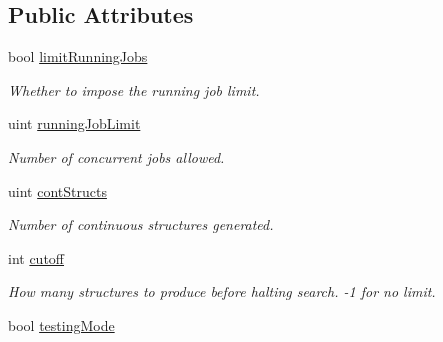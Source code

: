 \subsection*{Public Attributes}
\begin{DoxyCompactItemize}
\item 
\hypertarget{classGlobalSearch_1_1OptBase_a3b5202a4793e24dd7d42d1df9e94ee27}{bool \hyperlink{classGlobalSearch_1_1OptBase_a3b5202a4793e24dd7d42d1df9e94ee27}{limit\-Running\-Jobs}}\label{classGlobalSearch_1_1OptBase_a3b5202a4793e24dd7d42d1df9e94ee27}

\begin{DoxyCompactList}\small\item\em Whether to impose the running job limit. \end{DoxyCompactList}\item 
\hypertarget{classGlobalSearch_1_1OptBase_a02fd48b57bdd72ec4a4c20209967bd07}{uint \hyperlink{classGlobalSearch_1_1OptBase_a02fd48b57bdd72ec4a4c20209967bd07}{running\-Job\-Limit}}\label{classGlobalSearch_1_1OptBase_a02fd48b57bdd72ec4a4c20209967bd07}

\begin{DoxyCompactList}\small\item\em Number of concurrent jobs allowed. \end{DoxyCompactList}\item 
\hypertarget{classGlobalSearch_1_1OptBase_a973fbcff3e2abbc66c19236092439ce1}{uint \hyperlink{classGlobalSearch_1_1OptBase_a973fbcff3e2abbc66c19236092439ce1}{cont\-Structs}}\label{classGlobalSearch_1_1OptBase_a973fbcff3e2abbc66c19236092439ce1}

\begin{DoxyCompactList}\small\item\em Number of continuous structures generated. \end{DoxyCompactList}\item 
\hypertarget{classGlobalSearch_1_1OptBase_a6fe1eb9eef50d0c0851c7113cc8f24f0}{int \hyperlink{classGlobalSearch_1_1OptBase_a6fe1eb9eef50d0c0851c7113cc8f24f0}{cutoff}}\label{classGlobalSearch_1_1OptBase_a6fe1eb9eef50d0c0851c7113cc8f24f0}

\begin{DoxyCompactList}\small\item\em How many structures to produce before halting search. -\/1 for no limit. \end{DoxyCompactList}\item 
\hypertarget{classGlobalSearch_1_1OptBase_a4aee28dd2991e1ada81243d05a1f23c9}{bool \hyperlink{classGlobalSearch_1_1OptBase_a4aee28dd2991e1ada81243d05a1f23c9}{testing\-Mode}}\label{classGlobalSearch_1_1OptBase_a4aee28dd2991e1ada81243d05a1f23c9}


\end{DoxyCompactItemize}
